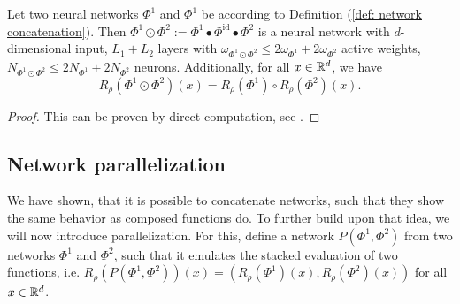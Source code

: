 \begin{lemma} \label{lemma: network concatenation}
    Let two neural networks $\Phi^1$ and $\Phi^1$ be according to Definition (\ref{def: network concatenation}).
    Then
    $\Phi^1 \odot \Phi^2 := \Phi^1 \bullet \Phi^{\text{id}} \bullet \Phi^2$ is a neural network with $d$-dimensional input, $L_1 + L_2$ layers
    with $\omega_{\Phi^1 \odot \Phi^2} \leq 2\omega_{\Phi^1}
    + 2\omega_{\Phi^2}$ active weights, $N_{\Phi^1 \odot \Phi^2} \leq 2N_{\Phi^1} + 2N_{\Phi^2}$ neurons. Additionally,
    for all $x \in \mathbb{R}^d$, we have
    \begin{equation*}
        R_\rho(\Phi^1 \odot \Phi^2)(x) = R_\rho(\Phi^1) \circ R_\rho(\Phi^2)(x).
    \end{equation*}
\end{lemma}
\begin{proof}
    This can be proven by direct computation, see \cite{gühring2019nn}.
\end{proof}

\subsection{Network parallelization}

We have shown, that it is possible to concatenate networks, such that they show the same behavior as
composed functions do. To 
further build upon that idea, we will now introduce parallelization. For this, define a network $P(\Phi^1, \Phi^2)$
from two networks $\Phi^1$ and $\Phi^2$, such that it
emulates the stacked evaluation of 
two functions, i.e. $R_\rho(P(\Phi^1, \Phi^2))(x) = (R_\rho(\Phi^1)(x), R_\rho(\Phi^2)(x))$ for all $x \in \mathbb{R}^d$.

